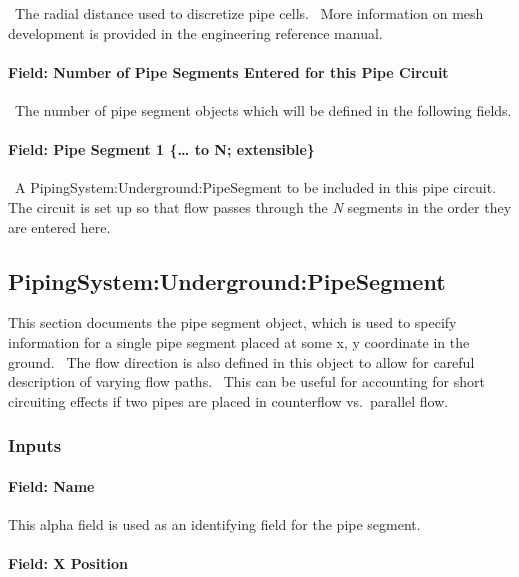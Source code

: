 ~The radial distance used to discretize pipe cells.~ More information on mesh development is provided in the engineering reference manual.

\paragraph{Field: Number of Pipe Segments Entered for this Pipe Circuit}\label{field-number-of-pipe-segments-entered-for-this-pipe-circuit}

~The number of pipe segment objects which will be defined in the following fields.

\paragraph{Field: Pipe Segment 1 \{\ldots{} to N; extensible\}}\label{field-pipe-segment-1-to-n-extensible}

~A PipingSystem:Underground:PipeSegment to be included in this pipe circuit.~ The circuit is set up so that flow passes through the \emph{N} segments in the order they are entered here.

\subsection{PipingSystem:Underground:PipeSegment}\label{pipingsystemundergroundpipesegment}

This section documents the pipe segment object, which is used to specify information for a single pipe segment placed at some x, y coordinate in the ground.~ The flow direction is also defined in this object to allow for careful description of varying flow paths.~ This can be useful for accounting for short circuiting effects if two pipes are placed in counterflow vs.~parallel flow.

\subsubsection{Inputs}\label{inputs-11-009}

\paragraph{Field: Name}\label{field-name-11-008}

This alpha field is used as an identifying field for the pipe segment.

\paragraph{Field: X Position}\label{field-x-position}

